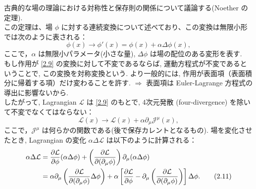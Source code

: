 \documentclass[a4paper,12pt]{article}
\begin{document}
古典的な場の理論における対称性と保存則の関係について議論する(Noether の定理).\\
この定理は、場 $\phi$ に対する連続変換について述べており、この変換は無限小形では次のように表される：
\begin{equation}\label{2.9}
\phi(x) \to \phi'(x) = \phi(x) + \alpha \Delta \phi(x),
\tag{2.9}
\end{equation}
ここで，$\alpha$ は無限小パラメータ(小さな量), $\Delta \phi$ は場の配位のある変形を表す.\\
もし作用が \eqref{2.9} の変換に対して不変であるならば, 運動方程式が不変であるということで, この変換を対称変換という.
より一般的には, 作用が表面項（表面積分に帰着する項）だけ変わることを許す. $\Longrightarrow$ 表面項は Euler-Lagrange 方程式の導出に影響ないから.\\
したがって, Lagrangian $\mathcal{L}$ は \eqref{2.9} のもとで, 4次元発散 (four-divergence) を除いて不変でなくてはならない：
\begin{equation}
\mathcal{L}(x) \to \mathcal{L}(x) + \alpha \partial_\mu \mathcal{J}^\mu(x),
\tag{2.10}
\end{equation}
ここで，$\mathcal{J}^\mu$ は何らかの関数である(後で保存カレントとなるもの).
場を変化させたとき, Lagrangian の変化 $\alpha \Delta \mathcal{L}$ は以下のように計算される：
\begin{align}
\alpha \Delta \mathcal{L} &= \frac{\partial \mathcal{L}}{\partial \phi} (\alpha \Delta \phi) + \left( \frac{\partial \mathcal{L}}{\partial (\partial_\mu \phi)} \right) \partial_\mu (\alpha \Delta \phi) \notag \\
&= \alpha \partial_\mu \left( \frac{\partial \mathcal{L}}{\partial (\partial_\mu \phi)} \Delta \phi \right) + \alpha \left[ \frac{\partial \mathcal{L}}{\partial \phi} - \partial_\mu \left( \frac{\partial \mathcal{L}}{\partial (\partial_\mu \phi)} \right) \right] \Delta \phi.
\label{2.11}\tag{2.11}
\end{align}

\color{blue}
\end{document}
